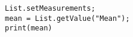 \begin{lstlisting}
List.setMeasurements;
mean = List.getValue("Mean");
print(mean)

\end{lstlisting}